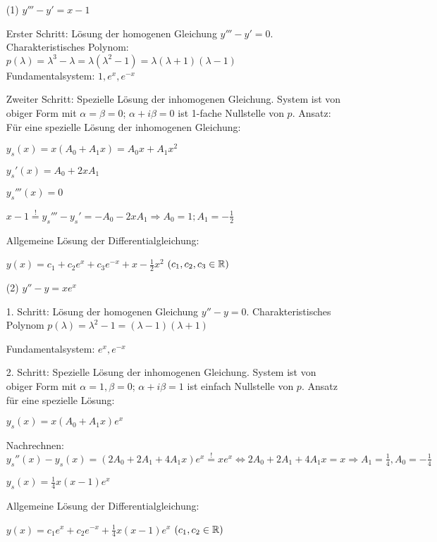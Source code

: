 \documentclass{article}
\begin{document}
\begin{beispiel}
\begin{itemize}
	\item[(1)] $y''' - y' = x-1$
	
	Erster Schritt: Lösung der homogenen Gleichung $y''' - y' = 0$. Charakteristisches Polynom: $p(\lambda) = \lambda^3-\lambda = \lambda(\lambda^2 - 1) = \lambda( \lambda + 1)(\lambda - 1)$ \\	
	Fundamentalsystem: $1, e^x, e^{-x}$
	
	Zweiter Schritt: Spezielle Lösung der inhomogenen Gleichung. System ist von obiger Form mit $\alpha= \beta = 0$; $\alpha + i \beta = 0$ ist 1-fache Nullstelle von $p$. Ansatz: Für eine spezielle Lösung der inhomogenen Gleichung:
	
	$y_s(x) = x ( A_0 + A_1 x) = A_0x + A_1 x^2$
	
	$y_s'(x) = A_0 + 2x A_1$
	
	$y_s'''(x) = 0$
	
	$x-1 \stackrel{!}{=}y_s''' - y_s' = -A_0 - 2xA_1 \Rightarrow A_0 = 1; A_1 = -\frac{1}{2}$
	
	Allgemeine Lösung der Differentialgleichung:
	
	$y(x) = c_1 + c_2e^x + c_3e^{-x} + x - \frac{1}{2}x^2$ $(c_1, c_2, c_3 \in \mathbb{R})$
	
	\item[(2)] $y'' - y = x e^x$
	
	1. Schritt: Lösung der homogenen Gleichung $y'' - y = 0$. Charakteristisches Polynom $p(\lambda) = \lambda^2 - 1 = (\lambda - 1)(\lambda + 1)$
	
	Fundamentalsystem: $e^x, e^{-x}$
	
	2. Schritt: Spezielle Lösung der inhomogenen Gleichung. System ist von obiger Form mit $\alpha = 1, \beta = 0$; $\alpha + i \beta = 1$ ist einfach Nullstelle von $p$. Ansatz für eine spezielle Lösung:
	
	$y_s(x) = x(A_0 + A_1 x) e^x$
	
	Nachrechnen: $y_s''(x) - y_s(x) = (2 A_0 + 2 A_1 + 4 A_1 x) e^x \stackrel{!}{=} xe^x \Leftrightarrow 2 A_0 + 2 A_1 + 4 A_1 x = x \Rightarrow A_1 = \frac{1}{4}, A_0 = - \frac{1}{4}$
	
	$y_s(x) = \frac{1}{4} x ( x-1) e^x$
	
	Allgemeine Lösung der Differentialgleichung:
	
	$y(x) = c_1 e^x + c_2 e^{-x} + \frac{1}{4}x(x-1)e^x$ $(c_1,c_2 \in \mathbb{R})$
	
\end{itemize}
\end{beispiel}
	
\end{document}
